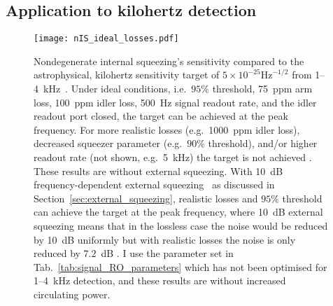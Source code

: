 \subsection{Application to kilohertz detection}
\label{sec:nIS_kHz}

\begin{figure}
    \centering
    \texttt{[image: nIS\_ideal\_losses.pdf]}
    \caption{   Nondegenerate internal squeezing's sensitivity compared to the astrophysical, kilohertz sensitivity target of $5\times10^{-25}\text{Hz}^{-1/2}$ from 1--4~kHz~\cite{miaoDesignGravitationalWaveDetectors2018}. Under ideal conditions, i.e.\ $95\%$ threshold, 75~ppm arm loss, 100~ppm idler loss, 500~Hz signal readout rate, and the idler readout port closed, the target can be achieved at the peak frequency. For more realistic losses (e.g.\ 1000~ppm idler loss), decreased squeezer parameter (e.g.\ $90\%$ threshold), and/or higher readout rate (not shown, e.g.\ 5~kHz) the target is not achieved . These results are without external squeezing. With 10~dB frequency-dependent external squeezing~\cite{} as discussed in Section~\ref{sec:external_squeezing}, realistic losses and $95\%$ threshold can achieve the target at the peak frequency, where 10~dB external squeezing means that in the lossless case the noise would be reduced by 10~dB uniformly but with realistic losses the noise is only reduced by $7.2$~dB .
    I use the parameter set in Tab.~\ref{tab:signal_RO_parameters} which has not been optimised for 1--4~kHz detection, and these results are without increased circulating power. }
    \label{fig:nIS_sens_target}
\end{figure}

